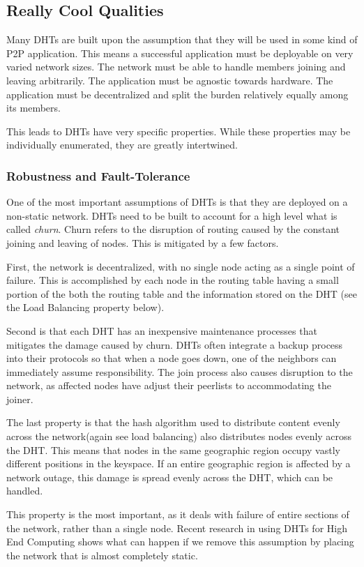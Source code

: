 \documentclass[10pt,letterpaper]{report}
\begin{document}
\subsection{Really Cool Qualities}
Many DHTs are built upon the assumption that they will be used in some kind of P2P application.
This means a successful application must be deployable on very varied network sizes.
The network must be able to handle members joining and leaving arbitrarily.
The application must be agnostic towards hardware.
The application must be decentralized and split the burden relatively equally among its members.

This leads to DHTs have very specific properties.
While these properties may be individually enumerated, they are greatly intertwined. 
\subsubsection{Robustness and Fault-Tolerance}
One of the most important assumptions of DHTs is that they are deployed on a non-static network.
DHTs need to be built to account for a high level what is called \textit{churn}.  
Churn refers to the disruption of routing caused by the constant joining and leaving of nodes.
This is mitigated by a few factors.

First, the network is decentralized, with no single node acting as a single point of failure.
This is accomplished by each node in the routing table having a small portion of the both the routing table and the information stored on the DHT (see the Load Balancing property below).

Second is that each DHT has an inexpensive maintenance processes that mitigates the damage caused by churn.
DHTs often integrate a backup process into their protocols so that when a node goes down, one of the neighbors can immediately assume responsibility.
The join process also causes disruption to the network, as affected nodes have adjust their peerlists to accommodating the joiner. 

The last property is that the hash algorithm used to distribute content evenly across the network(again see load balancing) also distributes nodes evenly across the DHT.  
This means that nodes in the same geographic region occupy vastly different positions in the keyspace.  
If an entire geographic region is affected by a network outage, this damage is spread evenly across the DHT, which can be handled.

This property is the most important, as it deals with failure of entire sections of the network, rather than a single node.
Recent research in using DHTs for High End Computing \cite{li2013zht} shows what can happen if we remove this assumption by placing the network that is almost completely static.
\end{document}
